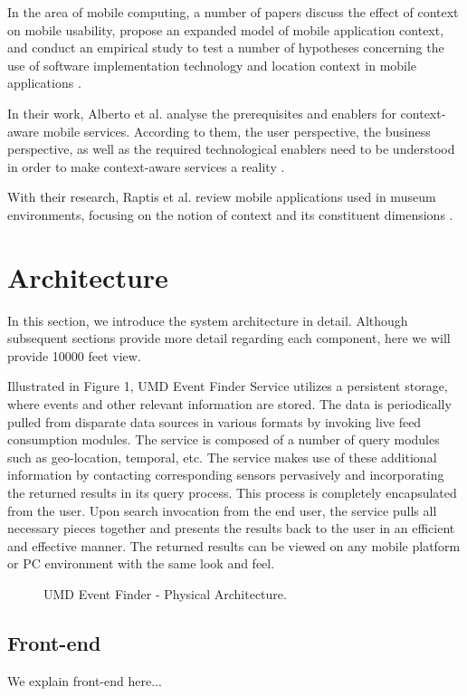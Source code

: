 \documentclass{acm_proc_article-sp}
\begin{document}
In the area of mobile computing, a number of papers discuss the effect of context on mobile usability, propose an expanded model of mobile application context, and conduct an empirical study to test a number of hypotheses concerning the use of software implementation technology and location context in mobile applications \cite{ryan:mobile}.

In their work, Alberto et al. analyse the prerequisites and enablers for context-aware mobile services. According to them,  the user perspective, the business perspective, as well as the required technological enablers need to be understood in order to make context-aware services a reality \cite{alberto:usercentric}.

With their research, Raptis et al. review mobile applications used in museum environments, focusing on the notion of context and its constituent dimensions \cite{raptis:museum}.

\section{Architecture}
In this section, we introduce the system architecture in detail. Although subsequent sections provide more detail regarding each component, here we will provide 10000 feet view.

Illustrated in Figure 1, UMD Event Finder Service utilizes a persistent storage, where events and other relevant information are stored. The data is periodically pulled from disparate data sources in various formats by invoking live feed consumption modules. The service is composed of a number of query modules such as geo-location, temporal, etc. The service makes use of these additional information by contacting corresponding sensors pervasively and incorporating the returned results in its query process. This process is completely encapsulated from the user. Upon search invocation from the end user, the service pulls all necessary pieces together and presents the results back to the user in an efficient and effective manner. The returned results can be viewed on any mobile platform or PC environment with the same look and feel.

\begin{figure*}
\centering
{}
\caption{UMD Event Finder - Physical Architecture.}
\end{figure*}

\subsection{Front-end}	 
We explain front-end here...
\end{document}
